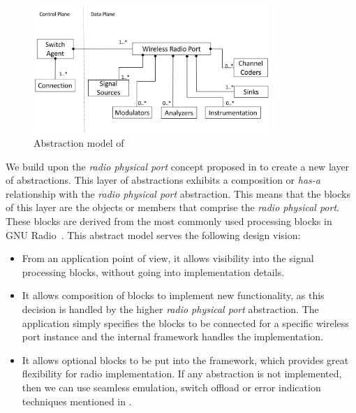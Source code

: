 \begin{figure}[t]
  \centering
  \includegraphics[width=0.8\textwidth]{figures/UML.pdf}
  \caption{Abstraction model of \crossflow}
  \label{fig:uml}
\end{figure}


We build upon the \emph{radio physical port} concept proposed in \aetherflow to create a new layer of abstractions. This layer of abstractions exhibits a composition or \emph{has-a} relationship with the \emph{radio physical port} abstraction. This means that the blocks of this layer are the objects or members that comprise the \emph{radio physical port}. These blocks are derived from the most commonly used processing blocks in GNU Radio~\cite{gnuradio}. This abstract model serves the following design vision:

\begin{itemize}
\item From an application point of view, it allows visibility into the signal processing blocks, without going into implementation details.
\item It allows composition of blocks to implement new functionality, as this decision is handled by the higher \emph{radio physical port} abstraction. The application simply specifies the blocks to be connected for a specific wireless port instance and the internal framework handles the implementation.
\item It allows optional blocks to be put into the framework, which provides great flexibility for radio implementation. If any abstraction is not implemented, then we can use seamless emulation, switch offload or error indication techniques mentioned in \cite{Casey:14}.
\end{itemize}

